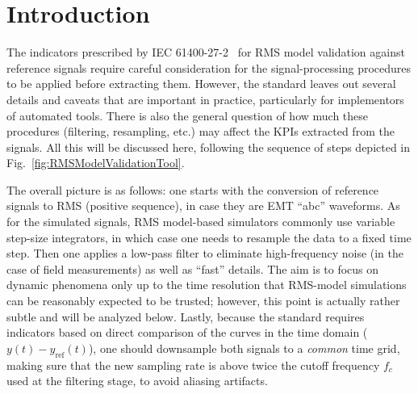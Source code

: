 \documentclass[11pt, a4paper, twoside, titlepage]{article}
\begin{document}
\tableofcontents




\section{Introduction}



The indicators prescribed by IEC 61400-27-2~\cite{iec27-2} for RMS model
validation against reference signals require careful consideration for the
signal-processing procedures to be applied before extracting them. However, the
standard leaves out several details and caveats that are important in practice,
particularly for implementors of automated tools. There is also the general
question of how much these procedures (filtering, resampling, etc.) may affect
the KPIs extracted from the signals.  All this will be discussed here, following
the sequence of steps depicted in Fig.~\ref{fig:RMSModelValidationTool}.

The overall picture is as follows: one starts with the conversion of reference
signals to RMS (positive sequence), in case they are EMT ``abc'' waveforms. As
for the simulated signals, RMS model-based simulators commonly use variable
step-size integrators, in which case one needs to resample the data to a fixed
time step. Then one applies a low-pass filter to eliminate high-frequency noise
(in the case of field measurements) as well as ``fast'' details. The aim is to
focus on dynamic phenomena only up to the time resolution that RMS-model
simulations can be reasonably expected to be trusted; however, this point is
actually rather subtle and will be analyzed below.  Lastly, because the standard
requires indicators based on direct comparison of the curves in the time domain
($y(t)-y_\text{ref}(t)$), one should downsample both signals to a \emph{common}
time grid, making sure that the new sampling rate is above twice the cutoff
frequency $f_c$ used at the filtering stage, to avoid aliasing artifacts.
\end{document}
